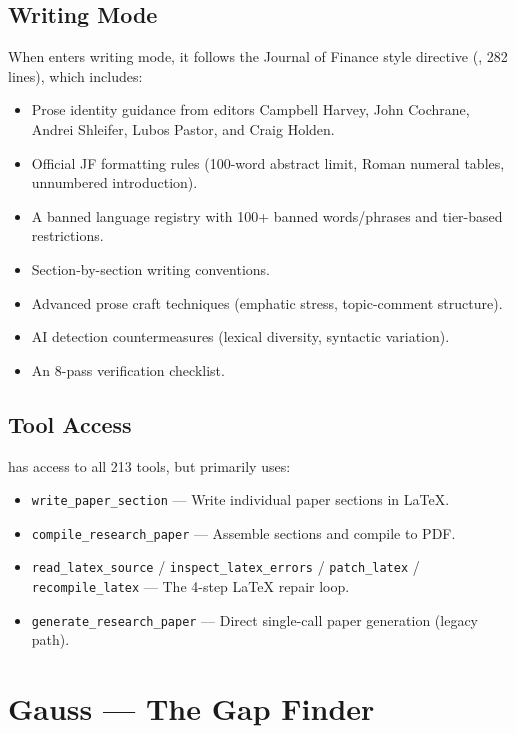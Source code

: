 \subsection{Writing Mode}

When \euler enters writing mode, it follows the Journal of Finance style directive (, 282 lines), which includes:

\begin{itemize}
  \item Prose identity guidance from editors Campbell Harvey, John Cochrane, Andrei Shleifer, Lubos Pastor, and Craig Holden.
  \item Official JF formatting rules (100-word abstract limit, Roman numeral tables, unnumbered introduction).
  \item A banned language registry with 100+ banned words/phrases and tier-based restrictions.
  \item Section-by-section writing conventions.
  \item Advanced prose craft techniques (emphatic stress, topic-comment structure).
  \item AI detection countermeasures (lexical diversity, syntactic variation).
  \item An 8-pass verification checklist.
\end{itemize}

\subsection{Tool Access}

\euler has access to all 213 tools, but primarily uses:

\begin{itemize}
  \item \texttt{write\_paper\_section} --- Write individual paper sections in \LaTeX{}.
  \item \texttt{compile\_research\_paper} --- Assemble sections and compile to PDF.
  \item \texttt{read\_latex\_source} / \texttt{inspect\_latex\_errors} / \texttt{patch\_latex} / \texttt{recompile\_latex} --- The 4-step \LaTeX{} repair loop.
  \item \texttt{generate\_research\_paper} --- Direct single-call paper generation (legacy path).
\end{itemize}

\section{Gauss --- The Gap Finder}
\label{sec:agents:gauss}

